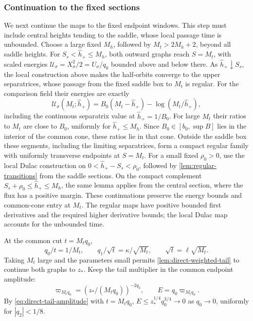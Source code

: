 \subsubsection{Continuation to the fixed sections}

We next continue the maps to the fixed endpoint windows. This step
must include central heights tending to the saddle, whose local passage
time is unbounded. Choose a large fixed \(M_h\), followed by
\(M_t>2M_h+2\), beyond all saddle heights. For
\(S_s<\widehat h_+\le M_h\), both outward graphs reach \(S=M_t\),
with scaled energies \(\mathcal U_\sigma=X_\sigma^2/2
=U_\sigma/q_0\) bounded above and below there. As
\(\widehat h_+\downarrow S_s\), the local construction above makes
the half-orbits converge to the upper separatrices, whose passage from
the fixed saddle box to \(M_t\) is regular.
For the comparison field their energies are exactly
\[
 \mathcal U_\sigma(M_t;\widehat h_+)
   =B_0(M_t-\widehat h_+)-\log(M_t/\widehat h_+),
\]
including the continuous separatrix value at \(\widehat h_+=1/B_0\).
For large \(M_t\) their ratios to \(M_t\) are close to \(B_0\),
uniformly for \(\widehat h_+\le M_h\). Since
\(B_0\in[b_0,\sup B]\) lies in the interior of the common cone, these
ratios lie in that cone.
Outside the saddle box these segments, including the limiting
separatrices, form a compact regular family with uniformly transverse
endpoints at \(S=M_t\). For a small fixed \(\rho_0>0\), use the local
Dulac construction on \(0<\widehat h_+-S_s<\rho_0\), followed by
\cref{lem:regular-transitions} from the saddle sections. On the compact
complement \(S_s+\rho_0\le\widehat h_+\le M_h\), the same lemma applies
from the central section, where the flux has a positive margin.
These continuations preserve the energy bounds and common-cone entry
at \(M_t\). The regular maps have positive bounded first derivatives
and the required higher derivative bounds; the local Dulac map
accounts for the unbounded time.

At the common cut \(t=M_tq_0\),
\[
 q_0/t=1/M_t,\qquad
 q_1/\sqrt t=\kappa/\sqrt{M_t},\qquad
 \sqrt t=\ell\sqrt{M_t}.
\]
Taking \(M_t\) large and the parameters small permits
\cref{lem:direct-weighted-tail} to continue both graphs to \(z_*\).
Keep the tail multiplier in the common endpoint amplitude:
\begin{equation}
\label{eq:direct-positive-amplitude}
 \varpi_{M_tq_0}=(z_*/(M_tq_0))^{-2q_2},\qquad E=q_0\varpi_{M_tq_0} .
\end{equation}
By \eqref{eq:direct-tail-amplitude} with \(t=M_tq_0\),
\(E\le z_*^{1/4}q_0^{3/4}\to0\) as \(q_0\to0\), uniformly for
\(|q_2|<1/8\).

